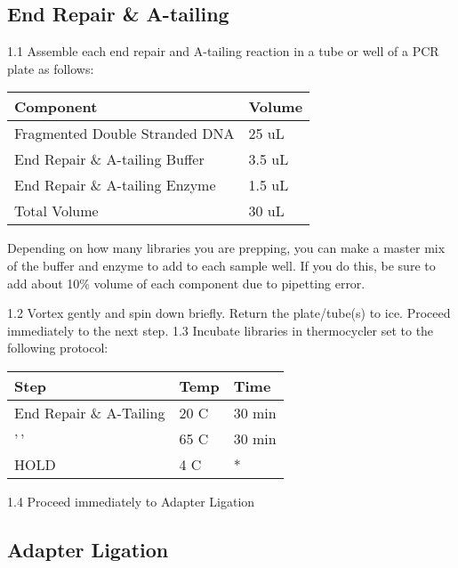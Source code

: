 \documentclass[
  letterpaper,
  DIV=11,
  numbers=noendperiod]{scrreprt}
\begin{document}
\hypertarget{end-repair-a-tailing}{%
\subsection*{\texorpdfstring{\textbf{End Repair \&
A-tailing}}{End Repair \& A-tailing}}\label{end-repair-a-tailing}}

1.1 Assemble each end repair and A-tailing reaction in a tube or well of
a PCR plate as follows:

\begin{longtable}[]{@{}ll@{}}
\toprule()
\textbf{Component} & \textbf{Volume} \\
\midrule()
\endhead
Fragmented Double Stranded DNA & 25 uL \\
End Repair \& A-tailing Buffer & 3.5 uL \\
End Repair \& A-tailing Enzyme & 1.5 uL \\
Total Volume & 30 uL \\
\bottomrule()
\end{longtable}

Depending on how many libraries you are prepping, you can make a master
mix of the buffer and enzyme to add to each sample well. If you do this,
be sure to add about 10\% volume of each component due to pipetting
error.

1.2 Vortex gently and spin down briefly. Return the plate/tube(s) to
ice. Proceed immediately to the next step. 1.3 Incubate libraries in
thermocycler set to the following protocol:

\begin{longtable}[]{@{}lll@{}}
\toprule()
\textbf{Step} & \textbf{Temp} & \textbf{Time} \\
\midrule()
\endhead
End Repair \& A-Tailing & 20 C & 30 min \\
'\,' & 65 C & 30 min \\
HOLD & 4 C & * \\
\bottomrule()
\end{longtable}

1.4 Proceed immediately to Adapter Ligation

\hypertarget{adapter-ligation}{%
\subsection*{\texorpdfstring{\textbf{Adapter
Ligation}}{Adapter Ligation}}\label{adapter-ligation}}
\end{document}
